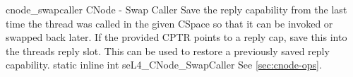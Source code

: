 %
%
%
%

\apidoc
{cnode_swapcaller}
{CNode  -  Swap Caller}
{Save the reply capability from the last time the thread was called in the given CSpace so that it can be invoked or swapped back later. If the provided CPTR points to a reply cap, save this into the threads reply slot. This can be used to restore a previously saved reply capability.}
{static inline int seL4\_CNode\_SwapCaller}
{
}
{\errorenumdesc}
{See \autoref{sec:cnode-ops}.}

